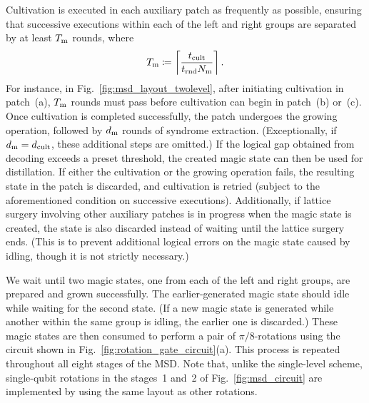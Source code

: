 \documentclass[
 prx,
 reprint,
 superscriptaddress,
 longbibliography,
 dvipsnames
]{revtex4-2}
\begin{document}
Cultivation is executed in each auxiliary patch as frequently as possible, ensuring that successive executions within each of the left and right groups are separated by at least $T_{\mathrm{m}}$ rounds, where
\begin{align*}
    T_{\mathrm{m}} \coloneqq \left\lceil \frac{t_{\mathrm{cult}}}{t_{\mathrm{rnd}}N_{\mathrm{m}}} \right\rceil.
\end{align*}
For instance, in Fig.~\ref{fig:msd_layout_twolevel}, after initiating cultivation in patch~(a), $T_{\mathrm{m}}$ rounds must pass before cultivation can begin in patch~(b) or~(c).
Once cultivation is completed successfully, the patch undergoes the growing operation, followed by $d_{\mathrm{m}}$ rounds of syndrome extraction.
(Exceptionally, if $d_{\mathrm{m}} = d_\mathrm{cult}$, these additional steps are omitted.)
If the logical gap obtained from decoding exceeds a preset threshold, the created magic state can then be used for distillation.
If either the cultivation or the growing operation fails, the resulting state in the patch is discarded, and cultivation is retried (subject to the aforementioned condition on successive executions).
Additionally, if lattice surgery involving other auxiliary patches is in progress when the magic state is created, the state is also discarded instead of waiting until the lattice surgery ends.
(This is to prevent additional logical errors on the magic state caused by idling, though it is not strictly necessary.)

We wait until two magic states, one from each of the left and right groups, are prepared and grown successfully.
The earlier-generated magic state should idle while waiting for the second state. 
(If a new magic state is generated while another within the same group is idling, the earlier one is discarded.)
These magic states are then consumed to perform a pair of $\pi/8$-rotations using the circuit shown in Fig.~\ref{fig:rotation_gate_circuit}(a).
This process is repeated throughout all eight stages of the MSD.
Note that, unlike the single-level scheme, single-qubit rotations in the stages~1 and~2 of Fig.~\ref{fig:msd_circuit} are implemented by using the same layout as other rotations.

\end{document}
